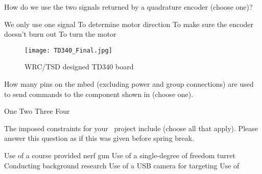 \documentclass[addpoints,noanswers]{exam}
\begin{document}
\begin{questions}
\question[1]
How do we use the two signals returned by a quadrature encoder (choose one)?
\begin{choices}
\choice We only use one signal
\CorrectChoice To determine motor direction
\choice To make sure the encoder doesn't burn out
\choice To turn the motor
\end{choices}


\clearpage
\begin{figure}[h]
\begin{center}
\texttt{[image: TD340\_Final.jpg]}
\end{center}
\caption{WRC/TSD designed TD340 board}
\label{fig:3}
\end{figure}

\question[1]
How many pins on the mbed (excluding power and group connections) are used to send commands to the component shown in  (choose one).
\begin{choices}
\choice One
\CorrectChoice Two
\choice Three
\choice Four
\end{choices}

\question[1]
The imposed constraints for your \usnaCourseNumber\ project include (choose all that apply). Please answer this question as if this was given before spring break.
\begin{choices}
\CorrectChoice Use of a course provided nerf gun
\CorrectChoice Use of a single-degree of freedom turret
\choice Conducting background research
\CorrectChoice Use of a USB camera for targeting
\CorrectChoice Use of \Matlab
\end{choices}
\end{questions}
\end{document}
